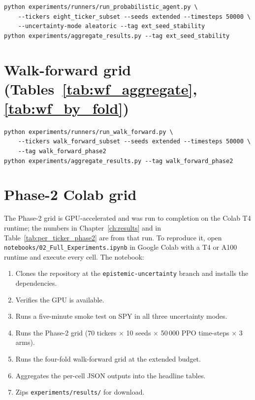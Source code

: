 \begin{verbatim}
python experiments/runners/run_probabilistic_agent.py \
    --tickers eight_ticker_subset --seeds extended --timesteps 50000 \
    --uncertainty-mode aleatoric --tag ext_seed_stability
python experiments/aggregate_results.py --tag ext_seed_stability
\end{verbatim}

\section{Walk-forward grid (Tables~\ref{tab:wf_aggregate}, \ref{tab:wf_by_fold})}
\label{app:walk_forward}

\begin{verbatim}
python experiments/runners/run_walk_forward.py \
    --tickers walk_forward_subset --seeds extended --timesteps 50000 \
    --tag walk_forward_phase2
python experiments/aggregate_results.py --tag walk_forward_phase2
\end{verbatim}

\section{Phase-2 Colab grid}
\label{app:phase2_colab}

The Phase-2 grid is GPU-accelerated and was run to completion on the Colab T4 runtime; the numbers in Chapter~\ref{ch:results} and in Table~\ref{tab:per_ticker_phase2} are from that run. To reproduce it, open \texttt{notebooks/02\_Full\_Experiments.ipynb} in Google Colab with a T4 or A100 runtime and execute every cell. The notebook:
\begin{enumerate}
  \item Clones the repository at the \texttt{epistemic-uncertainty} branch and installs the dependencies.
  \item Verifies the GPU is available.
  \item Runs a five-minute smoke test on SPY in all three uncertainty modes.
  \item Runs the Phase-2 grid (70 tickers $\times$ 10 seeds $\times$ 50\,000 PPO time-steps $\times$ 3 arms).
  \item Runs the four-fold walk-forward grid at the extended budget.
  \item Aggregates the per-cell JSON outputs into the headline tables.
  \item Zips \texttt{experiments/results/} for download.
\end{enumerate}

